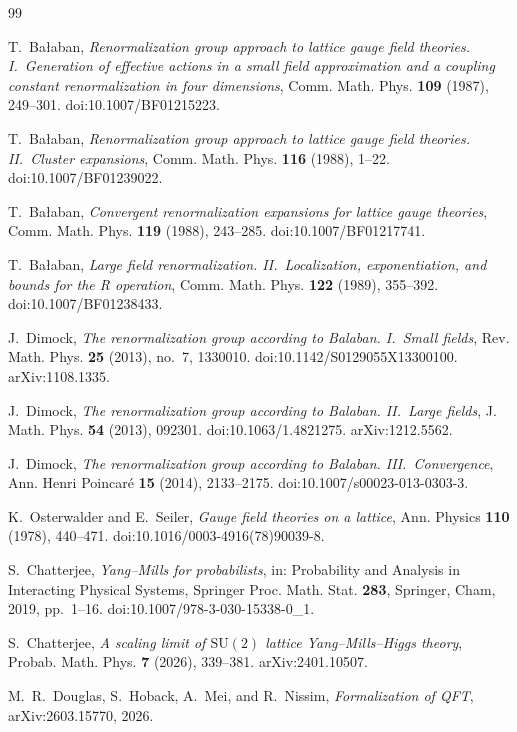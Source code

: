 \documentclass[11pt]{article}
\theoremstyle{definition}
\newcommand{\SU}{\mathrm{SU}}
\begin{document}
\begin{thebibliography}{99}

 T.~Ba{\l}aban,
\emph{Renormalization group approach to lattice gauge field theories.
I.~Generation of effective actions in a small field approximation and
a coupling constant renormalization in four dimensions},
Comm. Math. Phys. \textbf{109} (1987), 249--301.
doi:10.1007/BF01215223.

 T.~Ba{\l}aban,
\emph{Renormalization group approach to lattice gauge field theories.
II.~Cluster expansions},
Comm. Math. Phys. \textbf{116} (1988), 1--22.
doi:10.1007/BF01239022.

 T.~Ba{\l}aban,
\emph{Convergent renormalization expansions for lattice gauge
theories}, Comm. Math. Phys. \textbf{119} (1988), 243--285.
doi:10.1007/BF01217741.

 T.~Ba{\l}aban,
\emph{Large field renormalization. II.~Localization, exponentiation,
and bounds for the R operation},
Comm. Math. Phys. \textbf{122} (1989), 355--392.
doi:10.1007/BF01238433.

 J.~Dimock,
\emph{The renormalization group according to Balaban.
I.~Small fields},
Rev. Math. Phys. \textbf{25} (2013), no.~7, 1330010.
doi:10.1142/S0129055X13300100.  arXiv:1108.1335.

 J.~Dimock,
\emph{The renormalization group according to Balaban.
II.~Large fields},
J. Math. Phys. \textbf{54} (2013), 092301.
doi:10.1063/1.4821275.  arXiv:1212.5562.

 J.~Dimock,
\emph{The renormalization group according to Balaban.
III.~Convergence},
Ann. Henri Poincar\'e \textbf{15} (2014), 2133--2175.
doi:10.1007/s00023-013-0303-3.

 K.~Osterwalder and E.~Seiler,
\emph{Gauge field theories on a lattice},
Ann. Physics \textbf{110} (1978), 440--471.
doi:10.1016/0003-4916(78)90039-8.

 S.~Chatterjee,
\emph{Yang--Mills for probabilists}, in: Probability and Analysis in
Interacting Physical Systems, Springer Proc. Math. Stat. \textbf{283},
Springer, Cham, 2019, pp.~1--16.
doi:10.1007/978-3-030-15338-0\_1.

 S.~Chatterjee,
\emph{A scaling limit of $\SU(2)$ lattice Yang--Mills--Higgs theory},
Probab. Math. Phys. \textbf{7} (2026), 339--381.
arXiv:2401.10507.

 M.~R.~Douglas, S.~Hoback, A.~Mei, and R.~Nissim,
\emph{Formalization of QFT}, arXiv:2603.15770, 2026.


\end{thebibliography}
\end{document}

